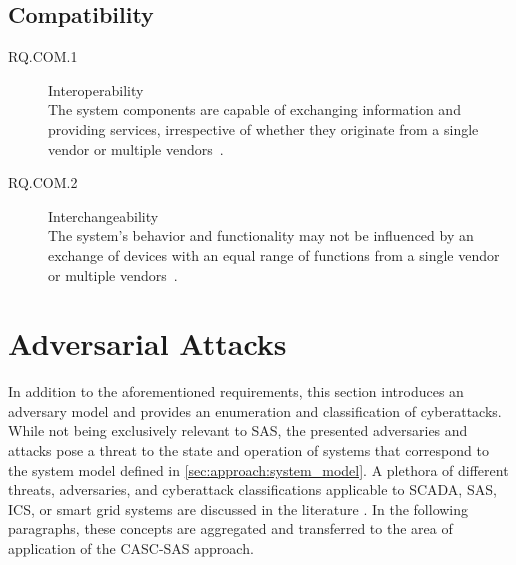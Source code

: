 \subsection{Compatibility}
\begin{description}
    \item[RQ.COM.1] Interoperability\\
    The system components are capable of exchanging information and providing services, irrespective of whether they originate from a single vendor or multiple vendors~\cite{IEC61850P5}.
    \item[RQ.COM.2] Interchangeability\\
    The system's behavior and functionality may not be influenced by an exchange of devices with an equal range of functions from a single vendor or multiple vendors~\cite{IEC61850P5}.
\end{description}

\section{Adversarial Attacks}
\label{sec:approach:attacks}
In addition to the aforementioned requirements, this section introduces an adversary model and provides an enumeration and classification of cyberattacks.
While not being exclusively relevant to SAS, the presented adversaries and attacks pose a threat to the state and operation of systems that correspond to the system model defined in \autoref{sec:approach:system_model}.
A plethora of different threats, adversaries, and cyberattack classifications applicable to SCADA, SAS, ICS, or smart grid systems are discussed in the literature \cite{Nicholson2012,Aloul2012,Rizzetti2015,Youssef2016,Cai2016,Hussain2021}.
In the following paragraphs, these concepts are aggregated and transferred to the area of application of the CASC-SAS approach.

